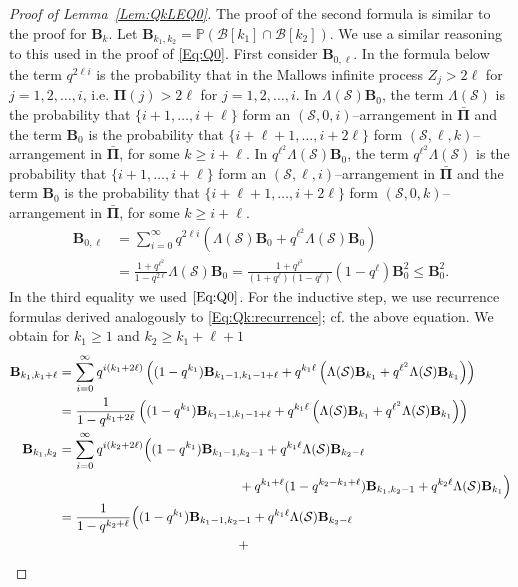 \documentclass[letterpaper,11pt]{article}
\theoremstyle{definition}
\theoremstyle{remark}
\renewcommand{\le}{\leqslant}
\renewcommand{\ge}{\geqslant}
\newcommand{\productO}{\Lambda(\cS)}
\newcommand{\Pra}[1]{\mathbb{P}\left(#1\right)}
\newcommand{\bB}{\mathbf{B}}
\newcommand{\cB}{\mathcal{B}}
\newcommand{\barPi}{\bar {\mathbf \Pi}}
\newcommand{\cS}{\mathcal{S}}
\begin{document}
\begin{proof}[Proof of Lemma~\ref{Lem:QkLEQ0}]
	The proof of the second formula is similar to the proof for $\bB_k$. Let $\bB_{k_1,k_2}=\Pra{\cB[k_1]\cap \cB[k_2]}$. We use a similar reasoning to this used in the proof of \eqref{Eq:Q0}. First consider $\bB_{0,\ell}$. In the formula below the term $q^{2\ell i}$ is the probability that in the Mallows infinite process $Z_j>2\ell$ for $j=1,2,\ldots,i$, i.e. ${\mathbf \Pi}(j)>2\ell$ for $j=1,2,\ldots,i$.  In $\productO\bB_0$, the term $\productO$ is the probability that $\{i+1,\ldots,i+\ell\}$ form an $(\cS,0,i)$--arrangement in $\barPi$ and the term $\bB_0$ is the probability that $\{i+\ell+1,\ldots,i+2\ell\}$ form $(\cS,\ell,k)$--arrangement in $\barPi$, for some $k\ge i+\ell$.   In $q^{\ell^2}\productO\bB_0$, the term $q^{\ell^2}\productO$ is the probability that $\{i+1,\ldots,i+\ell\}$ form an $(\cS,\ell,i)$--arrangement in $\barPi$ and the term $\bB_0$ is the probability that $\{i+\ell+1,\ldots,i+2\ell\}$ form $(\cS,0,k)$--arrangement in $\barPi$, for some $k\ge i+\ell$. 
	\[
	\begin{split}
		\bB_{0,\ell}
		&=\sum_{i=0}^{\infty}q^{2\ell i}\left(\productO\bB_0+q^{\ell^2}\productO\bB_0\right)\\
		&=\frac{1+q^{\ell^2}}{1-q^{2\ell}}\productO\bB_0=\frac{1+q^{\ell^2}}{(1+q^\ell)(1-q^{\ell})}(1-q^{\ell})\bB_0^2\le \bB_0^2.
	\end{split}
	\]
	In the third equality we used $\eqref{Eq:Q0}$. 
	For the inductive step, we use recurrence formulas derived analogously to \eqref{Eq:Qk:recurrence}; cf. the above equation. We obtain
	for $k_1\ge 1$ and $k_2\ge k_1+\ell+1$
	\begin{align*}
		\bB_{k_1,k_1+\ell}&=\sum_{i=0}^{\infty}q^{i(k_1+2\ell)}\left((1-q^{k_1})\bB_{k_1-1,k_1-1+\ell}+q^{k_1\ell}\left(\productO\bB_{k_1}+q^{\ell^2}\productO\bB_{k_1}\right)\right)\\
		&=\frac{1}{1-q^{k_1+2\ell}}\left((1-q^{k_1})\bB_{k_1-1,k_1-1+\ell}+q^{k_1\ell}\left(\productO\bB_{k_1}+q^{\ell^2}\productO\bB_{k_1}\right)\right)\\
		\bB_{k_1,k_2}&=\sum_{i=0}^{\infty}q^{i(k_2+2\ell)}
		\Big((1-q^{k_1})\bB_{k_1-1,k_2-1}
		+q^{k_1\ell}\productO\bB_{k_2-\ell}\\
		&\quad\hspace{4.5cm}+
		q^{k_1+\ell}(1-q^{k_2-k_1+\ell})\bB_{k_1,k_2-1}
		+q^{k_2\ell}\productO\bB_{k_1}
		\Big)\\
		&=\frac{1}{1-q^{k_2+\ell}}
		\Big((1-q^{k_1})\bB_{k_1-1,k_2-1}
		+q^{k_1\ell}\productO\bB_{k_2-\ell}\\
		&\quad\hspace{4.5cm}+

\end{align*}
\end{proof}
\end{document}
